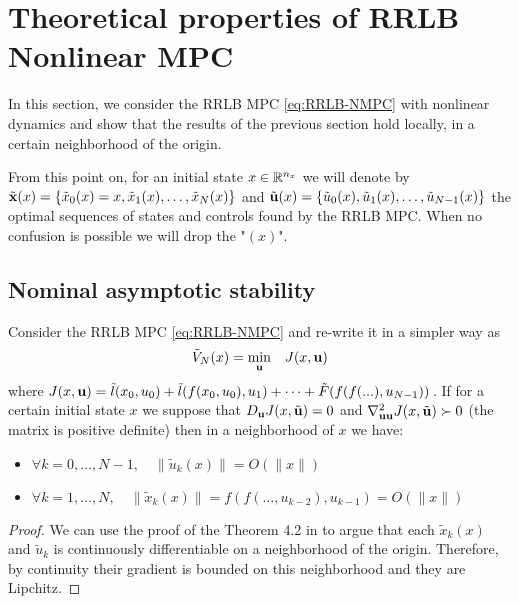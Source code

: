 \documentclass[12pt]{article}
\begin{document}
\section{Theoretical properties of RRLB Nonlinear MPC}\label{sec:RRLB-theoretical-properties}

In this section, we consider the RRLB MPC \ref{eq:RRLB-NMPC} with nonlinear dynamics and show that the results of the previous section hold locally, in a certain neighborhood of the origin.

From this point on, for an initial state $x\in\R^{n_x}$ we will denote by \newline
$\tilde{\bf{x}}(x)=\left\{ \tilde{x}_0(x)=x,\tilde{x}_1(x),\dots,\tilde{x}_N(x) \right\}$ and $\tilde{\bf{u}}(x)=\left\{ \tilde{u}_0(x),\tilde{u}_1(x),\dots,\tilde{u}_{N-1}(x) \right\}$ the optimal sequences of states and controls found by the RRLB MPC.
When no confusion is possible we will drop the "$(x)$".

\subsection{Nominal asymptotic stability}\label{sec:RRLB-nominal-stability}

\begin{lemma}
	\label{thm:Lipchitzianity}
	Consider the RRLB MPC \ref{eq:RRLB-NMPC} and re-write it in a simpler way as
	$$\tilde{V}_N(x)=\underset{\bf{u}}{\min} \quad J(x,\bf{u})$$
	where $J(x,\bf{u})=\tilde{l}(x_0,u_0)+\tilde{l}(f(x_0,u_0),u_1)+\dots+\tilde{F}(f(f(...),u_{N-1}))$\,.
	If for a certain initial state $x$ we suppose that $D_\bf{u}J(x,\tilde{\bf{u}})=0$ and $\nabla_{\bf{u}\bf{u}}^2J(x, \tilde{\bf{u}})\succ 0$ (the matrix is positive definite) then in a neighborhood of $x$ we have:
	\begin{itemize}[label=\textbullet]
		\item $\forall k=0,\dots,N-1,\quad \|\tilde{u}_k(x)\|=O(\|x\|)$
		\item $\forall k=1,\dots,N,\quad \|\tilde{x}_k(x)\|=f(f(\dots,u_{k-2}),u_{k-1})=O(\|x\|)$
	\end{itemize}
\end{lemma}
\begin{proof}
	We can use the proof of the Theorem 4.2 in \cite{lectures-parametric-optimization} to argue that each $\tilde{x}_k(x)$ and $\tilde{u}_k$ is continuously differentiable on a neighborhood of the origin.
	Therefore, by continuity their gradient is bounded on this neighborhood and they are Lipchitz.
\end{proof}
\end{document}
